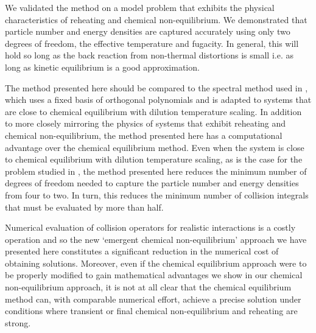 We validated the method on a model problem that exhibits the physical characteristics of reheating and chemical non-equilibrium.  We demonstrated that particle number and energy densities are captured accurately using only two degrees of freedom, the effective temperature and fugacity.  In general, this will hold so long as the back reaction from non-thermal distortions is small i.e. as long as kinetic equilibrium is a good approximation. 

The method presented here should be compared to the spectral method used in \cite{Esposito2000,Mangano2002}, which uses a fixed basis of orthogonal polynomials and is adapted to systems that are close to chemical equilibrium with dilution temperature scaling.  In addition to more closely mirroring the physics of systems that exhibit reheating and chemical non-equilibrium, the method presented here has a computational advantage over the chemical equilibrium method. Even when the system is close to chemical equilibrium with dilution temperature scaling, as is the case for the problem studied in \cite{Esposito2000,Mangano2002}, the method presented here reduces the minimum number of degrees of freedom needed to capture the particle number and energy densities from four to two.  In turn, this reduces the minimum number of collision integrals that must be evaluated by more than half.  

Numerical evaluation of collision operators for realistic interactions is a costly operation and so the new `emergent chemical non-equilibrium' approach we have presented here constitutes a significant reduction in the numerical cost of obtaining solutions. Moreover, even if the chemical equilibrium approach were to be properly modified to gain mathematical advantages we show  in our chemical non-equilibrium approach, it is not at all clear that the chemical equilibrium method can, with comparable numerical effort, achieve  a precise solution under conditions where transient or final chemical non-equilibrium and reheating are strong.


